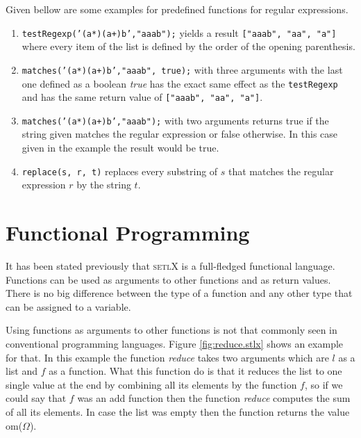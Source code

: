 \documentclass[11pt]{report}
\begin{document}
Given bellow are some examples for predefined functions for regular expressions.
\begin{enumerate}
\item \texttt{testRegexp('(a*)(a+)b',"aaab");} yields a result \texttt{["aaab", "aa", "a"]} where every item of the list is defined by the order of the opening parenthesis.
\item \texttt{matches('(a*)(a+)b',"aaab", true);} with three arguments with the last one defined as a boolean \textsl{true} has the exact same effect as the \texttt{testRegexp} and has the same return value of \texttt{["aaab", "aa", "a"]}.
\item \texttt{matches('(a*)(a+)b',"aaab");} with two arguments returns true if the string given matches the regular expression or false otherwise. In this case given in the example the result would be true.
\item \texttt{replace(s, r, t)} replaces every substring of $s$ that matches the regular expression $r$ by the string $t$.
\end{enumerate}


\section{Functional Programming}
It has been stated previously that \textsc{setlX} is a full-fledged functional language. Functions can be used as arguments to other functions and as return values. There is no big difference between the type of a function and any other type that can be assigned to a variable.

Using functions as arguments to other functions is not that commonly seen in conventional programming languages. Figure \ref{fig:reduce.stlx} shows an example for that. In this example the function \textsl{reduce} takes two arguments which are $l$ as a list and $f$ as a function. What this function do is that it reduces the list to one single value at the end by combining all its elements by the function $f$, so if we could say that $f$ was an add function then the function \textsl{reduce} computes the sum of all its elements. In case the list was empty then the function returns the value om($\Omega$).
\end{document}
